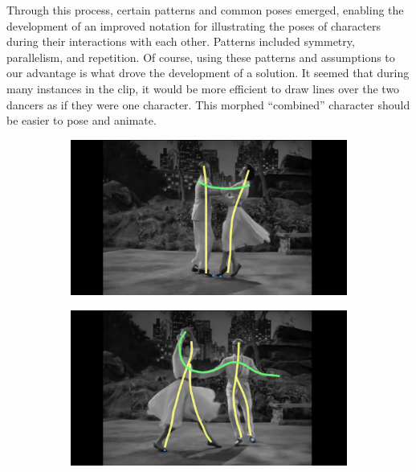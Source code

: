 Through this process, certain patterns and common poses emerged, enabling the development of an improved notation for illustrating the poses of characters during their interactions with each other. Patterns included symmetry, parallelism, and repetition. Of course, using these patterns and assumptions to our advantage is what drove the development of a solution. It seemed that during many instances in the clip, it would be more efficient to draw lines over the two dancers as if they were one character. This morphed ``combined'' character should be easier to pose and animate.

\begin{figure}[h!]
	\centering
        \begin{subfigure}[b!]{0.31\textwidth}
        	\centering
                \includegraphics[width=\linewidth]{img/keyframe_case_4_(3)}
                \label{fig:pose1}
        \end{subfigure}
        \quad
        \begin{subfigure}[b!]{0.31\textwidth}
        	\centering
                \includegraphics[width=\linewidth]{img/keyframe_case_10_(5)}

\end{subfigure}
\end{figure}
